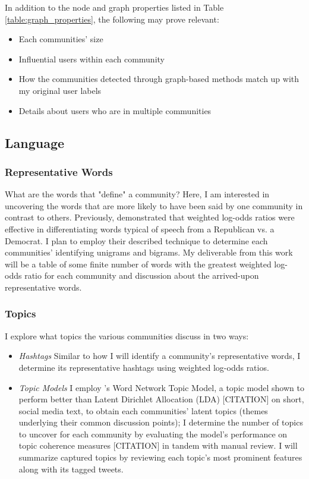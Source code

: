 \documentclass[acmlarge, screen, authorversion]{acmart}
\begin{document}
In addition to the node and graph properties listed in Table \ref{table:graph_properties}, the following may prove relevant:
\begin{itemize}
	\item Each communities' size
	\item Influential users within each community
	\item How the communities detected through graph-based methods match up with my original user labels
	\item Details about users who are in multiple communities
\end{itemize}

\subsection{Language}

\subsubsection{Representative Words}

What are the words that "define" a community? Here, I am interested in uncovering the words that are more likely to have been said by one community in contrast to others. Previously, \citet{monroeFightinWordsLexical2008} demonstrated that weighted log-odds ratios were effective in differentiating words typical of speech from a Republican vs. a Democrat. I plan to employ their described technique to determine each communities' identifying unigrams and bigrams. My deliverable from this work will be a table of some finite number of words with the greatest weighted log-odds ratio for each community and discussion about the arrived-upon representative words.

\subsubsection{Topics}

I explore what topics the various communities discuss in two ways:

\begin{itemize}
	\item \textit{Hashtags} Similar to how I will identify a community's representative words, I determine its representative hashtags using weighted log-odds ratios.

	\item \textit{Topic Models} I employ \citet{zuoWordNetworkTopic2016}'s Word Network Topic Model, a topic model shown to perform better than Latent Dirichlet Allocation (LDA) [CITATION] on short, social media text, to obtain each communities' latent topics (themes underlying their common discussion points); I determine the number of topics to uncover for each community by evaluating the model's performance on topic coherence measures [CITATION] in tandem with manual review. I will summarize captured topics by reviewing each topic's most prominent features along with its tagged tweets.

\end{itemize}
\end{document}
